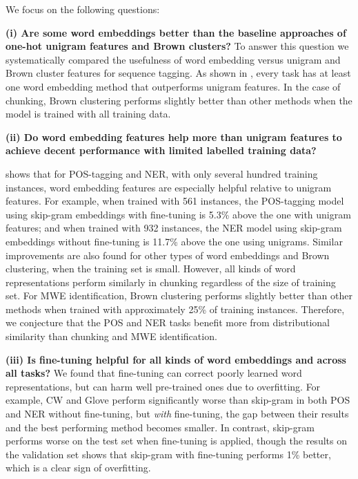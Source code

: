 We focus on the following questions:

\textbf{(i) Are some word embeddings better than the baseline approaches of one-hot unigram features and Brown clusters?}
To answer this question we systematically compared the usefulness of word embedding versus
unigram and Brown cluster features for sequence tagging.
As shown in , every task has at least one word embedding method that outperforms
unigram features. In the case of chunking, Brown clustering performs slightly better than other methods  when the model is trained with all training data. 


\textbf{(ii) Do word embedding features help more than unigram features to achieve decent performance with limited labelled training data?}

 shows that for POS-tagging and NER, with only several hundred training instances, 
word embedding features are especially helpful relative to unigram features. 
For example, when trained with 561 instances, the POS-tagging model using skip-gram embeddings with fine-tuning is 5.3\% above
the one with unigram features; and when trained with 932 instances, the NER model using skip-gram embeddings without fine-tuning is 11.7\% above the one using unigrams. 
Similar improvements are also found for other types of word embeddings and Brown clustering, when the training set is small. 
However, all kinds of word representations perform similarly in chunking regardless of the size of training set. 
For MWE identification, Brown clustering performs slightly better than other methods when trained with approximately 25\% of training instances. Therefore, we conjecture that the POS and NER tasks benefit more from distributional similarity than chunking and MWE identification.

\textbf{(iii) Is fine-tuning helpful for all kinds of word embeddings and across all tasks?}
We found that fine-tuning can correct poorly learned word representations, but can harm well pre-trained ones due to overfitting. For example, CW and Glove perform significantly worse than skip-gram in both POS and NER without fine-tuning, but \emph{with} fine-tuning, the gap between their results and the best performing method becomes smaller. In contrast, skip-gram performs worse on the test set when fine-tuning is applied, though the results on the validation set shows that skip-gram with fine-tuning performs 1\% better, which is a clear sign of overfitting.

